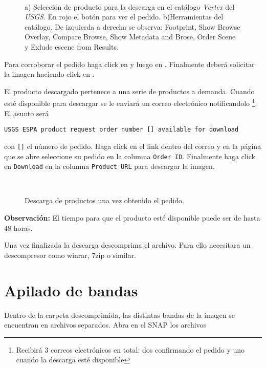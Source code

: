 \begin{figure}[H]
    \centering
    \\
    \caption{a) Selección de producto para la descarga en el catálogo \emph{Vertex} del \emph{USGS}. En rojo el botón para ver el pedido. b)Herramientas del catálogo. De izquierda a derecha se observa: Footprint, Show Browse Overlay, Compare Browse, Show Metadata and Brose, Order Scene y Exlude escene from Results.}
    \label{fig:descarga}
\end{figure}

Para corroborar el pedido haga click en  y luego en . Finalmente deberá solicitar la imagen haciendo click en .

El producto descargado pertenece a una serie de productos a demanda.  Cuando  esté disponible para descargar se le enviará un correo electrónico notificandolo \footnote{Recibirá 3 correos electrónicos en total: dos confirmando el pedido y uno cuando la descarga esté disponible}. El asunto será

\begin{center}
\texttt{USGS ESPA product request order number [] available for download}
\end{center}

con \texttt{[]} el número de pedido. Haga click en el link dentro del correo y en la página que se abre seleccione su pedido en la columna \texttt{Order ID}. Finalmente haga click en \texttt{Download} en la columna \texttt{Product URL} para descargar la imagen.

\begin{figure}[h!]
    \centering
    \\
    \caption{Descarga de productos una vez obtenido el pedido.}
    \label{fig:descarga2}
\end{figure}

\textbf{Observación:} El tiempo para que el producto esté disponible puede ser de hasta 48 horas.

Una vez finalizada la descarga descomprima el archivo. Para ello necesitara un descompresor como winrar, 7zip o similar.

\section{Apilado de bandas}
Dentro de la carpeta descomprimida, las distintas bandas de la imagen se encuentran en archivos separados. Abra en el SNAP los archivos

